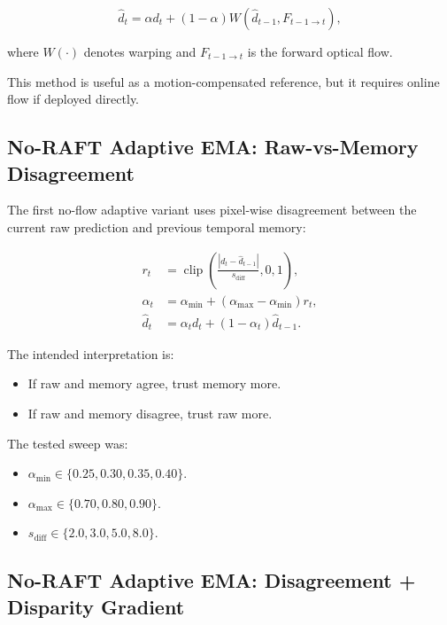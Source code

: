 \documentclass[11pt,a4paper]{article}
\begin{document}
\begin{equation}
    \hat{d}_t = \alpha d_t + (1-\alpha)W(\hat{d}_{t-1}, F_{t-1 \rightarrow t}),
\end{equation}

where $W(\cdot)$ denotes warping and $F_{t-1 \rightarrow t}$ is the forward optical flow.

This method is useful as a motion-compensated reference, but it requires online flow if deployed directly.

\subsection{No-RAFT Adaptive EMA: Raw-vs-Memory Disagreement}

The first no-flow adaptive variant uses pixel-wise disagreement between the current raw prediction and previous temporal memory:

\begin{align}
    r_t &= \operatorname{clip}\left(\frac{|d_t - \hat{d}_{t-1}|}{s_{\mathrm{diff}}}, 0, 1\right),\\
    \alpha_t &= \alpha_{\min} + (\alpha_{\max} - \alpha_{\min})r_t,\\
    \hat{d}_t &= \alpha_t d_t + (1-\alpha_t)\hat{d}_{t-1}.
\end{align}

The intended interpretation is:

\begin{itemize}[leftmargin=*]
    \item If raw and memory agree, trust memory more.
    \item If raw and memory disagree, trust raw more.
\end{itemize}

The tested sweep was:

\begin{itemize}[leftmargin=*]
    \item $\alpha_{\min} \in \{0.25,0.30,0.35,0.40\}$.
    \item $\alpha_{\max} \in \{0.70,0.80,0.90\}$.
    \item $s_{\mathrm{diff}} \in \{2.0,3.0,5.0,8.0\}$.
\end{itemize}

\subsection{No-RAFT Adaptive EMA: Disagreement + Disparity Gradient}
\end{document}
